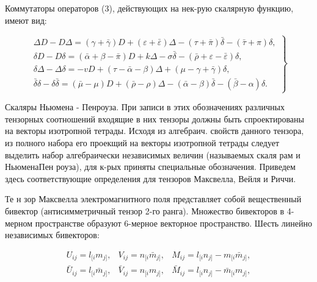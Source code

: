 \documentclass[10pt]{article}
\begin{document}
Коммутаторы операторов (3), действующих на нек-рую скалярную функцию, имеют вид:



\[

\left.\begin{array}{l}

\Delta D-D \Delta=(\gamma+\bar{\gamma}) D+(\varepsilon+\bar{\varepsilon}) \Delta-(\tau+\bar{\pi}) \bar{\delta}-(\bar{\tau}+\pi) \delta, \\

\delta D-D \delta=(\bar{\alpha}+\beta-\bar{\pi}) D+k \Delta-\sigma \bar{\delta}-(\bar{\rho}+\varepsilon-\bar{\varepsilon}) \delta, \\

\delta \Delta-\Delta \delta=-v D+(\tau-\bar{\alpha}-\beta) \Delta+(\mu-\gamma+\bar{\gamma}) \delta, \\

\bar{\delta} \delta-\delta \bar{\delta}=(\bar{\mu}-\mu) D+(\bar{\rho}-\rho) \Delta-(\bar{\alpha}-\beta) \bar{\delta}-(\bar{\beta}-\alpha) \delta .

\end{array}\right\}

\]



Скаляры Ньюмена - Пенроуза. При записи в этих обозначениях различных тензорных соотношений входящие в них тензоры должны быть спроектированы на векторы изотропной тетрады. Исходя из алгебраич. свойств данного тензора, из полного набора его проекщий на векторы изотропной тетрады следует выделить набор алгебраически независимых величин (называемых скаля рам и НьюменаПен роуза), для к-рых приняты специальные обозначения. Приведем здесь соответствующие определения для тензоров Максвелла, Вейля и Риччи.



Те н зор Максвелла электромагнитного поля представляет собой вещественный бивектор (антисимметричный тензор 2-го ранга). Множество бивекторов в 4-мерном пространстве образуют 6-мерное векторное пространство. Шесть линейно независимых бивекторов:



\[

\begin{array}{lll}

U_{i j}=l_{[i} m_{j]}, & V_{i j}=n_{[i} \bar{m}_{j]}, & M_{i j}=l_{[i} n_{j]}-m_{[i} \bar{m}_{j]}, \\

\bar{U}_{i j}=l_{[i} \bar{m}_{j]}, & \bar{V}_{i j}=n_{[i} m_{j]}, & \bar{M}_{i j}=l_{[i} n_{j]}-\bar{m}_{[i} m_{j]},

\end{array}

\]
\end{document}
